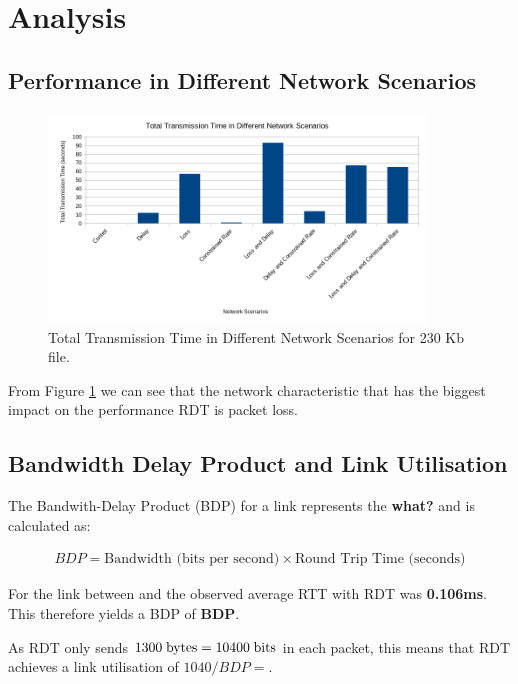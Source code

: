 \section{Analysis}

\subsection{Performance in Different Network Scenarios}
\label{sec:performance}

\begin{figure}[H]
\begin{center}
    \includegraphics[width=100mm]{images/performance-network-scenarios.png}
\end{center}
\caption{Total Transmission Time in Different Network Scenarios for 230 Kb file.}\label{fig:performance}
\end{figure}

From Figure \ref{fig:performance} we can see that the network characteristic that has the biggest impact on the performance RDT is packet loss. 

\subsection{Bandwidth Delay Product and Link Utilisation}

The Bandwith-Delay Product (BDP) for a link represents the \textbf{what?} and is calculated as:

\begin{align*}
    BDP = \text{Bandwidth (bits per second)} \times \text{Round Trip Time (seconds)}
\end{align*}

For the link between  and  the observed average RTT with RDT was \textbf{0.106ms}. This therefore yields a BDP of \textbf{BDP}.

As RDT only sends $1300 \text{\;bytes} = 10400 \text{\;bits}$ in each packet, this means that RDT achieves a link utilisation of $1040 / BDP = $.


